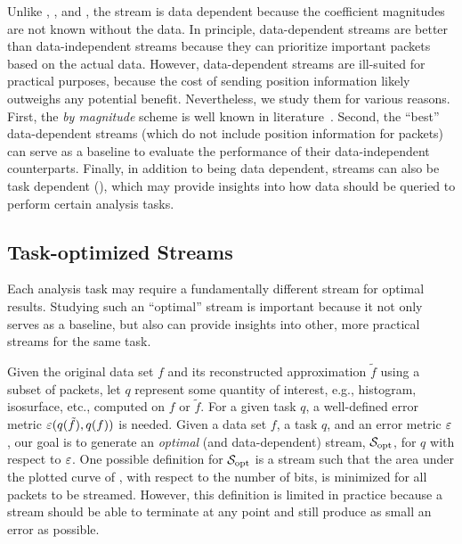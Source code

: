 Unlike \slvl, \sbit, and \swav, the \smag stream is data dependent because the coefficient
magnitudes are not known without the data.
%
In principle, data-dependent streams are better than data-independent streams because they can
prioritize important packets based on the actual data. However, data-dependent streams are
ill-suited for practical purposes, because the cost of sending position information likely outweighs
any potential benefit. Nevertheless, we study them for various reasons. First, the \emph{by
magnitude} scheme is well known in literature~\cite{vapor2007}. Second, the ``best'' data-dependent
streams (which do not include position information for packets) can serve as a baseline to evaluate
the performance of their data-independent counterparts. Finally, in addition to being data
dependent, streams can also be task dependent (), which may provide
insights into how data should be queried to perform certain analysis tasks.

\subsection{Task-optimized Streams} \label{sec:data_dep_streams}

Each analysis task may require a fundamentally different stream for optimal results. Studying such
an ``optimal'' stream is important because it not only serves as a baseline,
but also can provide insights into other, more practical streams for the same task.

Given the original data set $f$ and its reconstructed approximation $\tilde{f}$ using a subset of
packets, let $q$ represent some quantity of interest, e.g., histogram, isosurface, etc., computed on
$f$ or $\tilde{f}$. For a given task $q$, a well-defined error metric $\err(q(\tilde{f}),q(f))$ is
needed. Given a data set $f$, a task $q$, and an error metric $\err$, our goal is to generate an
\emph{optimal} (and data-dependent) stream, $\sopt$, for $q$ with respect to $\err$. One possible
definition for $\sopt$ is a stream such that the area under the plotted curve of \err, with respect
to the number of bits, is minimized for all packets to be streamed. However, this definition is
limited in practice because a stream should be able to terminate at any point and still produce as
small an error as possible.

